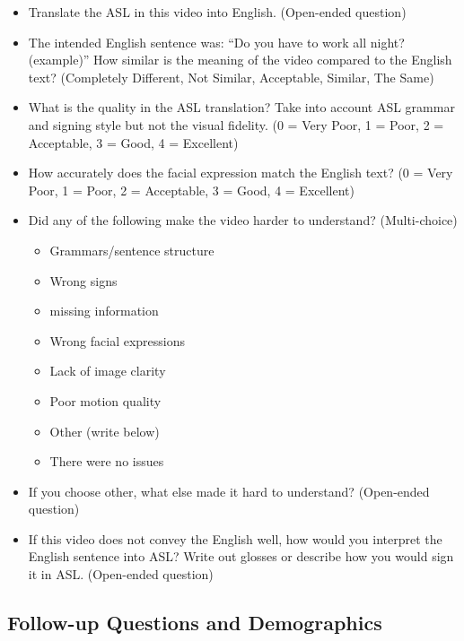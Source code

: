 \begin{itemize}
    \item Translate the ASL in this video into English. (Open-ended question)
    \item The intended English sentence was: ``Do you have to work all night? (example)'' How similar is the meaning of the video compared to the English text? (Completely Different, Not Similar, Acceptable, Similar, The Same)
    \item What is the quality in the ASL translation? Take into account ASL grammar and signing style but not the visual fidelity. (0 = Very Poor, 1 = Poor, 2 = Acceptable, 3 = Good, 4 = Excellent)
    \item How accurately does the facial expression match the English text? (0 = Very Poor, 1 = Poor, 2 = Acceptable, 3 = Good, 4 = Excellent)
    \item Did any of the following make the video harder to understand? (Multi-choice)
    \begin{itemize}
        \item Grammars/sentence structure
        \item Wrong signs
        \item missing information
        \item Wrong facial expressions
        \item Lack of image clarity
        \item Poor motion quality
        \item Other (write below)
        \item There were no issues
    \end{itemize}
    \item If you choose other, what else made it hard to understand? (Open-ended question)
    \item If this video does not convey the English well, how would you interpret the English sentence into ASL? Write out glosses or describe how you would sign it in ASL. (Open-ended question)
\end{itemize}

\subsection{Follow-up Questions and Demographics}

